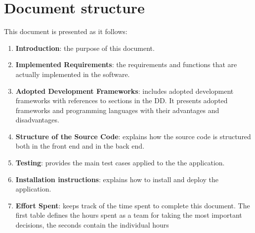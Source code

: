\section{Document structure}
This document is presented as it follows:
\begin{enumerate}
	\item \textbf{Introduction}: the purpose of this document.

	\item \textbf{Implemented Requirements}: the requirements and functions that are actually implemented in the software.


	\item \textbf{Adopted Development Frameworks}: includes adopted development frameworks with references to sections in the DD. It presents adopted frameworks and programming languages with their advantages and disadvantages.

	\item \textbf{Structure of the Source Code}: explains how the source code is structured both in the front end and in the back end.

    \item \textbf{Testing}: provides the main test cases applied to the the application.
    
    \item \textbf{Installation instructions}: explains how to install and deploy the
    application.

	\item \textbf{Effort Spent}: keeps track of the time spent to complete this document. The first table	defines the hours spent as a team for taking the most important decisions, the seconds	contain the individual hours
\end{enumerate}
